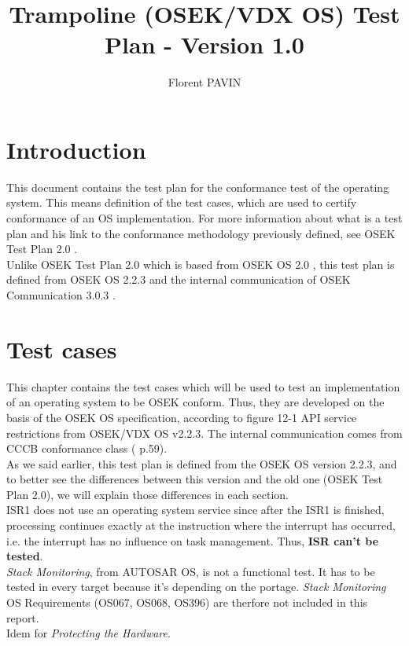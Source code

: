 \documentclass[10pt]{article}
\title{Trampoline (OSEK/VDX OS) Test Plan - Version 1.0}
\author{Florent PAVIN}
\begin{document}

\maketitle
\tableofcontents

\section{Introduction}
This document contains the test plan for the conformance test of the operating system. This means definition of the test cases, which are used to certify conformance of an OS implementation. For more information about what is a test plan and his link to the conformance methodology previously defined, see OSEK Test Plan 2.0  \cite{OSEK_Test_Plan_20}.\\
Unlike OSEK Test Plan 2.0  which is based from OSEK OS 2.0  \cite{OSEK_OS_20}, this test plan is defined from OSEK OS 2.2.3  \cite{OSEK_OS_223} and the internal communication of OSEK Communication 3.0.3 \cite{OSEK_COM_303} .\\

\section{Test cases}
This chapter contains the test cases which will be used to test an implementation of an operating system to be OSEK conform. Thus, they are developed on the basis of the OSEK OS specification, according to figure 12-1 API service restrictions from OSEK/VDX OS v2.2.3. The internal communication comes from CCCB conformance class (\cite{OSEK_COM_303} p.59).\\
As we said earlier, this test plan is defined from the OSEK OS version 2.2.3, and to better see the differences between this version and the old one (OSEK Test Plan 2.0), we will explain those differences in each section.\\
ISR1 does not use an operating system service since after the ISR1 is finished, processing continues exactly at the instruction where the interrupt has occurred, i.e. the interrupt has no influence on task management. Thus, \textbf{ISR can't be tested}.\\
\textit{Stack Monitoring}, from AUTOSAR OS, is not a functional test. It has to be tested in every target because it's depending on the portage. \textit{Stack Monitoring} OS Requirements (OS067, OS068, OS396) are therfore not included in this report.\\
Idem for \textit{Protecting the Hardware}.\\
	
\end{document}
